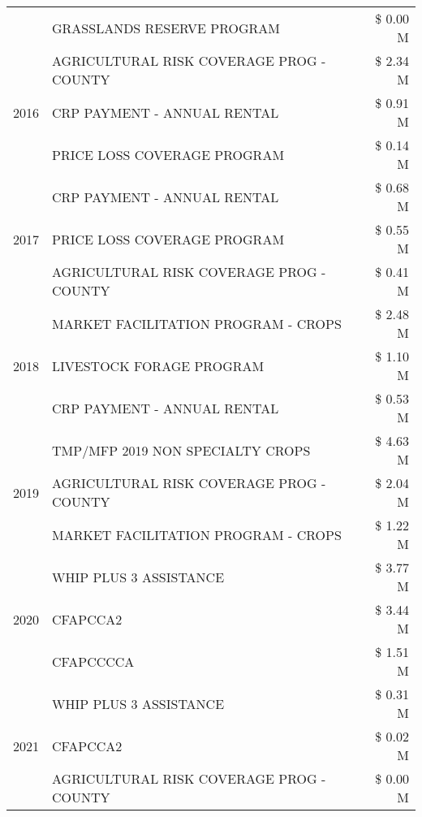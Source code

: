 \begin{tabular}{llr}
 & GRASSLANDS RESERVE PROGRAM & \$ 0.00 M \\
\cline{1-3}
\multirow[t]{3}{*}{2016} & AGRICULTURAL RISK COVERAGE PROG - COUNTY & \$ 2.34 M \\
 & CRP PAYMENT - ANNUAL RENTAL & \$ 0.91 M \\
 & PRICE LOSS COVERAGE PROGRAM & \$ 0.14 M \\
\cline{1-3}
\multirow[t]{3}{*}{2017} & CRP PAYMENT - ANNUAL RENTAL & \$ 0.68 M \\
 & PRICE LOSS COVERAGE PROGRAM & \$ 0.55 M \\
 & AGRICULTURAL RISK COVERAGE PROG - COUNTY & \$ 0.41 M \\
\cline{1-3}
\multirow[t]{3}{*}{2018} & MARKET FACILITATION PROGRAM - CROPS & \$ 2.48 M \\
 & LIVESTOCK FORAGE PROGRAM & \$ 1.10 M \\
 & CRP PAYMENT - ANNUAL RENTAL & \$ 0.53 M \\
\cline{1-3}
\multirow[t]{3}{*}{2019} & TMP/MFP 2019 NON SPECIALTY CROPS & \$ 4.63 M \\
 & AGRICULTURAL RISK COVERAGE PROG - COUNTY & \$ 2.04 M \\
 & MARKET FACILITATION PROGRAM - CROPS & \$ 1.22 M \\
\cline{1-3}
\multirow[t]{3}{*}{2020} & WHIP PLUS 3 ASSISTANCE & \$ 3.77 M \\
 & CFAPCCA2 & \$ 3.44 M \\
 & CFAPCCCCA & \$ 1.51 M \\
\cline{1-3}
\multirow[t]{3}{*}{2021} & WHIP PLUS 3 ASSISTANCE & \$ 0.31 M \\
 & CFAPCCA2 & \$ 0.02 M \\
 & AGRICULTURAL RISK COVERAGE PROG - COUNTY & \$ 0.00 M \\
\cline{1-3}
\bottomrule
\end{tabular}
